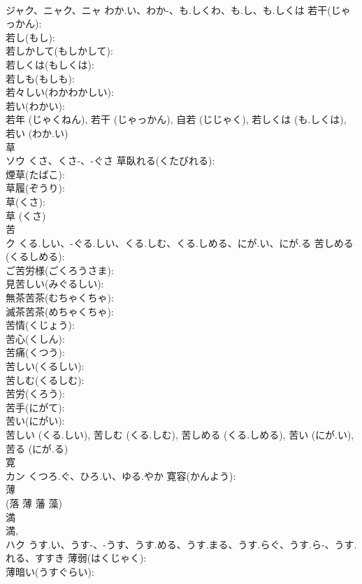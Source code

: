 \documentclass[8pt]{extreport}
\begin{document}
\begin{CJK}{UTF8}{min}
\\	ジャク、ニャク、ニャ	わか.い、わか-、も.しくわ、も.し、も.しくは	若干(じゃっかん): 
\\	若し(もし): 
\\	若しかして(もしかして): 
\\	若しくは(もしくは): 
\\	若しも(もしも): 
\\	若々しい(わかわかしい): 
\\	若い(わかい): 
\\	若年 (じゃくねん), 若干 (じゃっかん), 自若 (じじゃく), 若しくは (も.しくは), 若い (わか.い)
\\	草			
\\	ソウ	くさ、くさ-、-ぐさ	草臥れる(くたびれる): 
\\	煙草(たばこ): 
\\	草履(ぞうり): 
\\	草(くさ): 
\\	草 (くさ)
\\	苦			
\\	ク	くる.しい、-ぐる.しい、くる.しむ、くる.しめる、にが.い、にが.る	苦しめる(くるしめる): 
\\	ご苦労様(ごくろうさま): 
\\	見苦しい(みぐるしい): 
\\	無茶苦茶(むちゃくちゃ): 
\\	滅茶苦茶(めちゃくちゃ): 
\\	苦情(くじょう): 
\\	苦心(くしん): 
\\	苦痛(くつう): 
\\	苦しい(くるしい): 
\\	苦しむ(くるしむ): 
\\	苦労(くろう): 
\\	苦手(にがて): 
\\	苦い(にがい): 
\\	苦しい (くる.しい), 苦しむ (くる.しむ), 苦しめる (くる.しめる), 苦い (にが.い), 苦る (にが.る)
\\	寛			
\\	カン	くつろ.ぐ、ひろ.い、ゆる.やか	寛容(かんよう): 
\\	薄			
\\	(落 薄 藩 藻) 
\\	満 
\\	満, 
\\	ハク	うす.い、うす-、-うす、うす.める、うす.まる、うす.らぐ、うす.ら-、うす.れる、すすき	薄弱(はくじゃく): 
\\	薄暗い(うすぐらい): 

\end{CJK}
\end{document}
